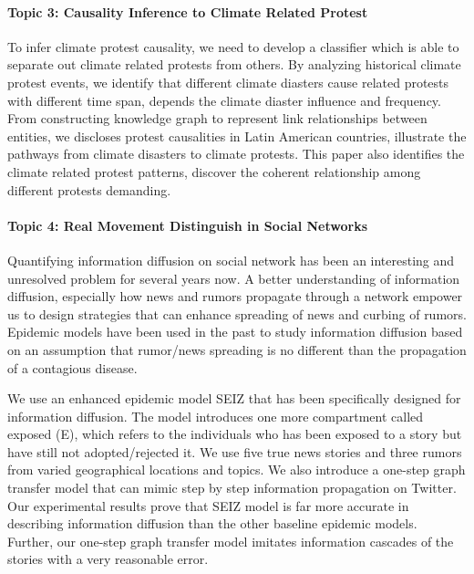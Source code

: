 \paragraph{Topic 3: Causality Inference to Climate Related Protest}
To infer climate protest causality, we need to develop a classifier which is able to separate out climate related protests from others. By analyzing historical climate protest events, we identify that different climate diasters cause related protests with different time span, depends the climate diaster influence and frequency. From constructing knowledge graph to represent link relationships between entities, we discloses protest causalities in Latin American countries, illustrate
the pathways from climate disasters to climate protests. This paper also identifies the climate related protest patterns, discover the coherent relationship among different protests demanding.



\paragraph{Topic 4: Real Movement Distinguish in Social Networks}

Quantifying information diffusion on social network has been an interesting and unresolved problem for several years now. A better understanding of information diffusion, especially how news and rumors propagate through a network empower us to design strategies that can enhance spreading of news and curbing of rumors. Epidemic models have been used in the past to study information diffusion based on an assumption that rumor/news spreading is no different than the propagation of a contagious disease.

We use an enhanced epidemic model SEIZ that has been specifically designed for information diffusion. The model introduces one more compartment called exposed (E), which refers to the individuals who has been exposed to a story but have still not adopted/rejected it. We use five true news stories and three rumors from varied geographical locations and topics. We also introduce a one-step graph transfer model that can mimic step by step information propagation on Twitter. Our experimental results prove that SEIZ model is far more accurate in describing information diffusion than the other baseline epidemic models. Further, our one-step graph transfer model imitates information cascades of the stories with a very reasonable error.

